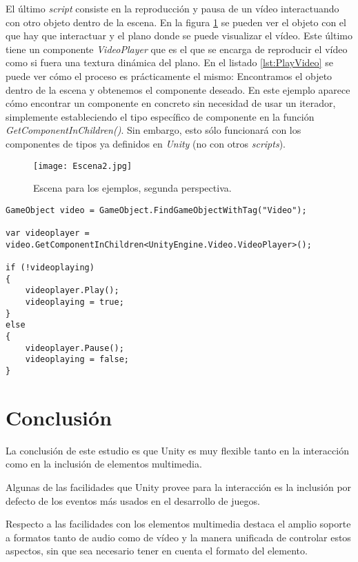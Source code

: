 \documentclass{pre-tfg}
\begin{document}
El último \textit{script} consiste en la reproducción y pausa de un vídeo interactuando con otro objeto dentro de la escena. En la figura \ref{fig:Escena2} se pueden ver el objeto con el que hay que interactuar y el plano donde se puede visualizar el vídeo. Este último tiene un componente \textit{VideoPlayer} que es el que se encarga de reproducir el vídeo como si fuera una textura dinámica del plano. En el listado \ref{lst:PlayVideo} se puede ver cómo el proceso es prácticamente el mismo: Encontramos el objeto dentro de la escena y obtenemos el componente deseado. En este ejemplo aparece cómo encontrar un componente en concreto sin necesidad de usar un iterador, simplemente estableciendo el tipo específico de componente en la función \textit{GetComponentInChildren()}. Sin embargo, esto sólo funcionará con los componentes de tipos ya definidos en \textit{Unity} (no con otros \textit{scripts}). 

\begin{figure}[htb]
	\centering
	\texttt{[image: Escena2.jpg]}
	\caption{Escena para los ejemplos, segunda perspectiva.}
	\label{fig:Escena2}
\end{figure}

\begin{spacing}{1}
\begin{lstlisting}[float=htbp, caption=Inicio y pausa del vídeo desde el objeto con el que se interactúa, label=lst:PlayVideo]
GameObject video = GameObject.FindGameObjectWithTag("Video");

var videoplayer = video.GetComponentInChildren<UnityEngine.Video.VideoPlayer>();

if (!videoplaying)
{
	videoplayer.Play();
	videoplaying = true;
}
else
{
	videoplayer.Pause();
	videoplaying = false;
}
\end{lstlisting}
\end{spacing}

\section{Conclusión}

La conclusión de este estudio es que Unity es muy flexible tanto en la interacción como en la inclusión de elementos multimedia. 

Algunas de las facilidades que Unity provee para la interacción es la inclusión por defecto de los eventos más usados en el desarrollo de juegos.

Respecto a las facilidades con los elementos multimedia destaca el amplio soporte a formatos tanto de audio como de vídeo y la manera unificada de controlar estos aspectos, sin que sea necesario tener en cuenta el formato del elemento.

\clearpage


\nocite{*}
\printbibliography
\end{document}
